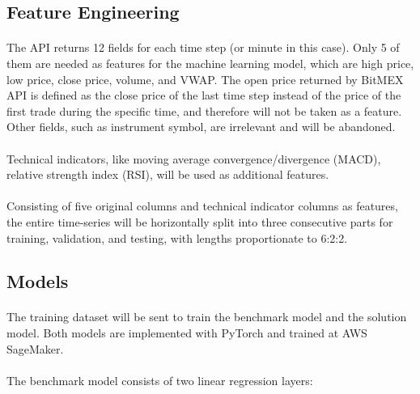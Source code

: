 \documentclass[12pt, letterpaper]{article}
\begin{document}
\subsection{Feature Engineering}

\paragraph{}
The API returns 12 fields for each time step (or minute in this case). Only 5 of them are needed as features for the machine learning model, which are high price, low price, close price, volume, and VWAP. The open price returned by BitMEX API is defined as the close price of the last time step instead of the price of the first trade during the specific time, and therefore will not be taken as a feature. Other fields, such as instrument symbol, are irrelevant and will be abandoned.

\paragraph{}
Technical indicators, like moving average convergence/divergence (MACD), relative strength index (RSI), will be used as additional features.

\paragraph{}
Consisting of five original columns and technical indicator columns as features, the entire time-series will be horizontally split into three consecutive parts for training, validation, and testing, with lengths proportionate to 6:2:2.

\subsection{Models}

\paragraph{}
The training dataset will be sent to train the benchmark model and the solution model. Both models are implemented with PyTorch and trained at AWS SageMaker.

\paragraph{}
The benchmark model consists of two linear regression layers:
\end{document}
